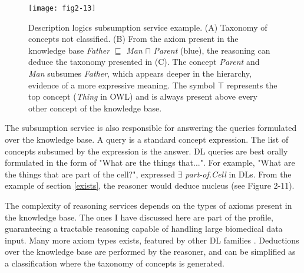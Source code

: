 \begin{figure}[ht]
    \centering
    \texttt{[image: fig2-13]}
    \caption{Description logics subsumption service example. (A) Taxonomy of concepts not classified. (B) From the axiom present in the knowledge base \emph{Father} $ \sqsubseteq $ \emph{Man} $ \sqcap $ \emph{Parent} (blue), the reasoning can deduce the taxonomy presented in (C). The concept \emph{Parent} and \emph{Man} subsumes \emph{Father}, which appears deeper in the hierarchy, evidence of a more expressive meaning. The symbol $ \top $ represents the top concept (\emph{Thing} in OWL) and is always present above every other concept of the knowledge base.}
    \label{fig2-13}
\end{figure}

The subsumption service is also responsible for answering the queries formulated over the knowledge base. A query is a standard concept expression. The list of concepts subsumed by the expression is the answer. DL queries are best orally formulated in the form of "What are the things that...". For example, "What are the things that are part of the cell?", expressed $ \exists $ \emph{part-of.Cell} in DLs. From the example of section \ref{exists}, the reasoner would deduce nucleus (see Figure 2-11).

The complexity of reasoning services depends on the types of axioms present in the knowledge base. The ones I have discussed here are part of the  profile, guaranteeing a tractable reasoning capable of handling large biomedical data input. Many more axiom types exists, featured by other DL families \citep{krotzsch2012owl}. Deductions over the knowledge base are performed by the reasoner, and can be simplified as a classification where the taxonomy of concepts is generated. 

